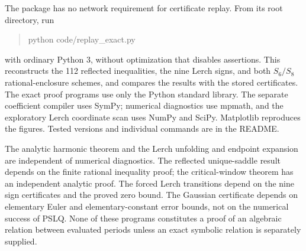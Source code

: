 The package has no network requirement for certificate replay.
From its root directory, run
\begin{quote}\ttfamily
python code/replay\_exact.py
\end{quote}
with ordinary Python 3, without optimization that disables assertions.
This reconstructs the 112 reflected inequalities, the nine Lerch
signs, and both $S_6/S_8$ rational-enclosure schemes, and compares the
results with the stored certificates. The exact proof programs use
only the Python standard library. The separate coefficient compiler
uses SymPy; numerical diagnostics use mpmath, and the exploratory
Lerch coordinate scan uses NumPy and SciPy. Matplotlib reproduces the
figures. Tested versions and individual commands are in the README.

The analytic harmonic theorem and the Lerch unfolding and endpoint
expansion are independent of numerical diagnostics.
The reflected unique-saddle result depends on the finite rational
inequality proof; the critical-window theorem has an independent
analytic proof. The forced Lerch transitions depend on the nine sign
certificates and the proved zero bound. The Gaussian certificate
depends on elementary Euler and elementary-constant error bounds,
not on the numerical success of PSLQ. None of these programs
constitutes a proof of an algebraic relation between evaluated
periods unless an exact symbolic relation is separately supplied.

